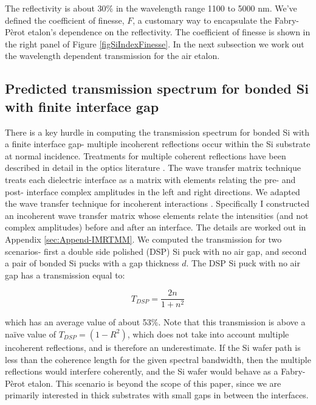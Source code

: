 \documentclass[osajnl,preprint,showpacs,superscriptaddress,12pt]{revtex4-1} %
\begin{document}
The reflectivity is about 30\% in the wavelength range 1100 to 5000 nm.  We've defined the coefficient of finesse\cite{2007fuph.book.....S}, $F$, a customary way to encapsulate the Fabry-P\`{e}rot etalon's dependence on the reflectivity.  The coefficient of finesse is shown in the right panel of Figure \ref{figSiIndexFinesse}.  In the next subsection we work out the wavelength dependent transmission for the air etalon.


\subsection{Predicted transmission spectrum for bonded Si with finite interface gap}
\label{secTheory}
There is a key hurdle in computing the transmission spectrum for bonded Si with a finite interface gap- multiple incoherent reflections occur within the Si substrate at normal incidence.  Treatments for multiple coherent reflections have been described in detail in the optics literature \cite{2007fuph.book.....S}.  The wave transfer matrix technique treats each dielectric interface as a matrix with elements relating the pre- and post- interface complex amplitudes in the left and right directions.  We adapted the wave transfer technique for incoherent interactions \cite{2002ApOpt..41.3978K}.  Specifically I constructed an incoherent wave transfer matrix whose elements relate the intensities (and not complex amplitudes) before and after an interface.  The details are worked out in Appendix \ref{sec:Append-IMRTMM}.  We computed the transmission for two scenarios- first a double side polished (DSP) Si puck with no air gap, and second a pair of bonded Si pucks with a gap thickness $d$.  The DSP Si puck with no air gap has a transmission equal to:

$$
T_{DSP} = \frac{2n}{1+n^2}
$$

which has an average value of about 53\%.  Note that this transmission is above a na\"ive value of $T_{DSP}=(1-R^2)$, which does not take into account multiple incoherent reflections, and is therefore an underestimate.  If the Si wafer path is less than the coherence length for the given spectral bandwidth, then the multiple reflections would interfere coherently, and the Si wafer would behave as a Fabry-P\`erot etalon.  This scenario is beyond the scope of this paper, since we are primarily interested in thick substrates with small gaps in between the interfaces.
\end{document}
